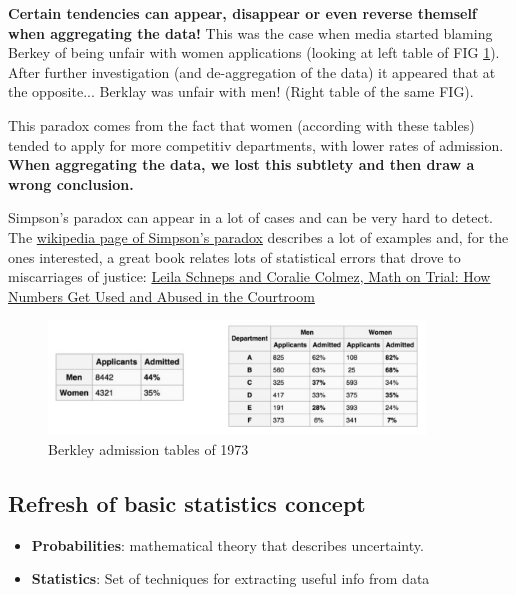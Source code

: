 \documentclass[a4paper,11pt,twoside]{article}
\begin{document}
\textbf{Certain tendencies can appear, disappear or even reverse themself when aggregating the data!} This was the case when media started blaming Berkey of being unfair with women applications (looking at left table of FIG \ref{pic:Berkley}). After further investigation (and de-aggregation of the data) it appeared that at the opposite... Berklay was unfair with men! (Right table of the same FIG).

This paradox comes from the fact that women (according with these tables) tended to apply for more competitiv departments, with lower rates of admission. \textbf{When aggregating the data, we lost this subtlety and then draw a wrong conclusion.} 

Simpson's paradox can appear in a lot of cases and can be very hard to detect. The \href{https://en.wikipedia.org/wiki/Simpsons_paradox}{wikipedia page of Simpson's paradox} describes a lot of examples and, for the ones interested, a great book relates lots of statistical errors that drove to miscarriages of justice: \href{https://books.google.ch/books/about/Math_on_Trial.html?id=PFAIb6FTgY4C&source=kp_cover&redir_esc=y&hl=fr}{Leila Schneps and Coralie Colmez, Math on Trial: How Numbers Get Used and Abused in the Courtroom} 

\begin{figure}[h]%
 \centering
 \includegraphics[width=10cm]{./pic/Berkley}
 \caption{\label{pic:Berkley}Berkley admission tables of 1973}
\end{figure}

\subsection{Refresh of basic statistics concept}

\begin{itemize}
	\item {\bf Probabilities}: mathematical theory that describes uncertainty. \\
	\item {\bf Statistics}: Set of techniques for extracting useful info from data
\end{itemize}
\end{document}
